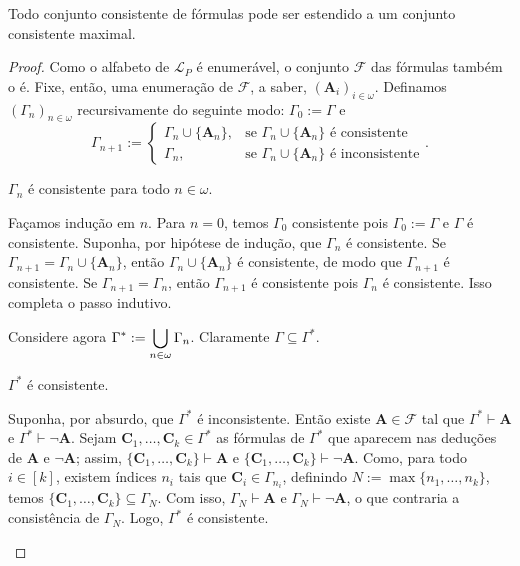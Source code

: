 \begin{theorem}[Lindenbaum]
    Todo conjunto consistente de fórmulas pode ser estendido a um conjunto consistente maximal.
\end{theorem}

\begin{proof}
    Como o alfabeto de $\mathcal{L}_P$ é enumerável, o conjunto $\mathcal{F}$ das fórmulas também o é. Fixe, então, uma enumeração de $\mathcal{F}$, a saber, $(\mathbf{A}_i)_{i \in \omega}$. Definamos $(\Gamma_n)_{n \in \omega}$ recursivamente do seguinte modo: $\Gamma_0 := \Gamma$ e
        \[
            \Gamma_{n+1} := 
                \begin{cases} 
                    \Gamma_{n} \cup \{\mathbf{A}_n\}, & \text{se } \Gamma_{n} \cup \{\mathbf{A}_n\} \text{ é consistente} \\
                    \Gamma_{n}, & \text{se } \Gamma_{n} \cup \{\mathbf{A}_n\} \text{ é inconsistente}
                \end{cases}.
        \]
        \begin{claim}
            $\Gamma_n$ é consistente para todo $n \in \omega$.
        \end{claim}
        \begin{midproof}
            Façamos indução em $n$. Para $n=0$, temos $\Gamma_0$ consistente pois $\Gamma_0 := \Gamma$ e $\Gamma$ é consistente. Suponha, por hipótese de indução, que $\Gamma_n$ é consistente. Se $\Gamma_{n+1} = \Gamma_{n} \cup \{\mathbf{A}_n\}$, então $\Gamma_{n} \cup \{\mathbf{A}_n\}$ é consistente, de modo que $\Gamma_{n+1}$ é consistente. Se $\Gamma_{n+1} = \Gamma_n$, então $\Gamma_{n+1}$ é consistente pois $\Gamma_n$ é consistente. Isso completa o passo indutivo. \whiteproof
        \end{midproof}
    Considere agora $\displaystyle \Gamma^* := \bigcup_{n \in \omega} \Gamma_n$. Claramente $\Gamma \subseteq \Gamma^*$.
        \begin{claim}
            $\Gamma^*$ é consistente.
        \end{claim}
        \begin{midproof}
            Suponha, por absurdo, que $\Gamma^*$ é inconsistente. Então existe $\mathbf{A} \in \mathcal{F}$ tal que $\Gamma^* \vdash \mathbf{A}$ e $\Gamma^* \vdash \neg \mathbf{A}$. Sejam $\mathbf{C}_1, \ldots, \mathbf{C}_k \in \Gamma^*$ as fórmulas de $\Gamma^*$ que aparecem nas deduções de $\mathbf{A}$ e $\neg \mathbf{A}$; assim, $\{\mathbf{C}_1, \ldots, \mathbf{C}_k \} \vdash \mathbf{A}$ e $\{\mathbf{C}_1, \ldots, \mathbf{C}_k \} \vdash \neg\mathbf{A}$. Como, para todo $i \in [k]$, existem índices $n_i$ tais que $\mathbf{C}_i \in \Gamma_{n_i}$, definindo $N := \max{\{n_1, \ldots, n_k\}}$, temos $\{\mathbf{C}_1, \ldots, \mathbf{C}_k \} \subseteq \Gamma_{N}$. Com isso, $\Gamma_N \vdash \mathbf{A}$ e $\Gamma_N \vdash \neg \mathbf{A}$, o que contraria a consistência de $\Gamma_N$. Logo, $\Gamma^*$ é consistente. \whiteproof

\end{midproof}
\end{proof}
